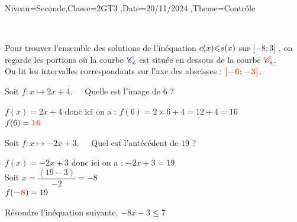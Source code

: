 \documentclass[a4paper,11pt,fleqn]{article}
\begin{document}
\begin{Maquette}[Fiche]{Niveau=Seconde,Classe=2GT3 ,Date=20/11/2024   ,Theme=Contrôle}
\begin{exercice}
\begin{tikzpicture}[baseline, scale=0.8]
\end{tikzpicture}\\
\end{exercice}

\begin{Solution}
 Pour trouver l'ensemble des solutions de l'inéquation $c(x){\color{black}\boldsymbol{\leqslant}}s(x)$ sur [$-8;$3] , on regarde les portions où la courbe ${\color{blue}\boldsymbol{\mathscr{C}_c}}$ est située en dessous de la  courbe ${\color{red}\boldsymbol{\mathscr{C}_s}}$.\\On lit les intervalles correspondants sur l'axe des abscisses : ${\color[HTML]{f15929}\boldsymbol{ [-6;-3]}}$.
\end{Solution}

\begin{exercice}


 Soit $f: x \longmapsto 2x+4$. \,\,\,\,\, Quelle est l'image de $6$ ?\\
\end{exercice}

\begin{Solution}
 $f(x)=2x+4$ donc ici on a : $f(6)=2\times 6+4=12+4=16$\\$f(6)={\color[HTML]{f15929}\boldsymbol{16}}$
\end{Solution}

\begin{exercice}


 Soit $f: x \longmapsto -2x+3$. \,\,\,\,\, Quel est l'antécédent de $19$ ?\\
\end{exercice}

\begin{Solution}
 $f(x)=-2x+3$ donc ici on a : $-2x+3=19$ \\Soit $x=\dfrac{(19-3)}{-2}=-8$\\$f({\color[HTML]{f15929}\boldsymbol{-8}})=19$
\end{Solution}

\begin{exercice}

Résoudre l'inéquation suivante.
 $-8x-3\leqslant7$\\
\end{exercice}


\end{Maquette}
\end{document}
